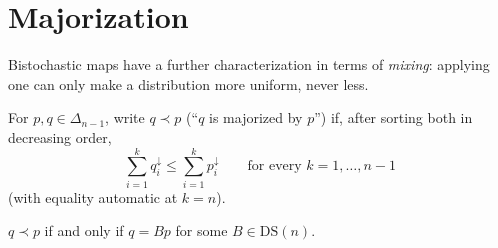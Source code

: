 \section{Majorization}

Bistochastic maps have a further characterization in terms of \emph{mixing}:
applying one can only make a distribution more uniform, never less.

\begin{definition}[Majorization]
For $p, q \in \Delta_{n-1}$, write $q \prec p$ (``$q$ is majorized by $p$'')
if, after sorting both in decreasing order,
\begin{equation}
\sum_{i=1}^k q_i^{\downarrow} \le \sum_{i=1}^k p_i^{\downarrow} \qquad \text{for
every } k = 1,\dots,n-1
\end{equation}
(with equality automatic at $k=n$).
\end{definition}

\begin{theorem}
\label{thm:hlp}
$q \prec p$ if and only if $q = Bp$ for some $B \in \mathrm{DS}(n)$.
\end{theorem}

